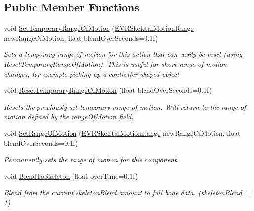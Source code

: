 \subsection*{Public Member Functions}
\begin{DoxyCompactItemize}
\item 
void \mbox{\hyperlink{class_valve_1_1_v_r_1_1_steam_v_r___behaviour___skeleton_acb49db7eda897b9e4d01867fcec6809c}{Set\+Temporary\+Range\+Of\+Motion}} (\mbox{\hyperlink{namespace_valve_1_1_v_r_affc8d18345f8f5d36f1ae7b4ce534500}{E\+V\+R\+Skeletal\+Motion\+Range}} new\+Range\+Of\+Motion, float blend\+Over\+Seconds=0.\+1f)
\begin{DoxyCompactList}\small\item\em Sets a temporary range of motion for this action that can easily be reset (using Reset\+Temporary\+Range\+Of\+Motion). This is useful for short range of motion changes, for example picking up a controller shaped object \end{DoxyCompactList}\item 
void \mbox{\hyperlink{class_valve_1_1_v_r_1_1_steam_v_r___behaviour___skeleton_a6c11072fc9e994df093e4226cbb80054}{Reset\+Temporary\+Range\+Of\+Motion}} (float blend\+Over\+Seconds=0.\+1f)
\begin{DoxyCompactList}\small\item\em Resets the previously set temporary range of motion. Will return to the range of motion defined by the range\+Of\+Motion field. \end{DoxyCompactList}\item 
void \mbox{\hyperlink{class_valve_1_1_v_r_1_1_steam_v_r___behaviour___skeleton_ac01993cb9c2ee1465966b9330365664f}{Set\+Range\+Of\+Motion}} (\mbox{\hyperlink{namespace_valve_1_1_v_r_affc8d18345f8f5d36f1ae7b4ce534500}{E\+V\+R\+Skeletal\+Motion\+Range}} new\+Range\+Of\+Motion, float blend\+Over\+Seconds=0.\+1f)
\begin{DoxyCompactList}\small\item\em Permanently sets the range of motion for this component. \end{DoxyCompactList}\item 
void \mbox{\hyperlink{class_valve_1_1_v_r_1_1_steam_v_r___behaviour___skeleton_a52072e1064b22388257dbd4b965a5550}{Blend\+To\+Skeleton}} (float over\+Time=0.\+1f)
\begin{DoxyCompactList}\small\item\em Blend from the current skeleton\+Blend amount to full bone data. (skeleton\+Blend = 1) \end{DoxyCompactList}\item 

\end{DoxyCompactItemize}

